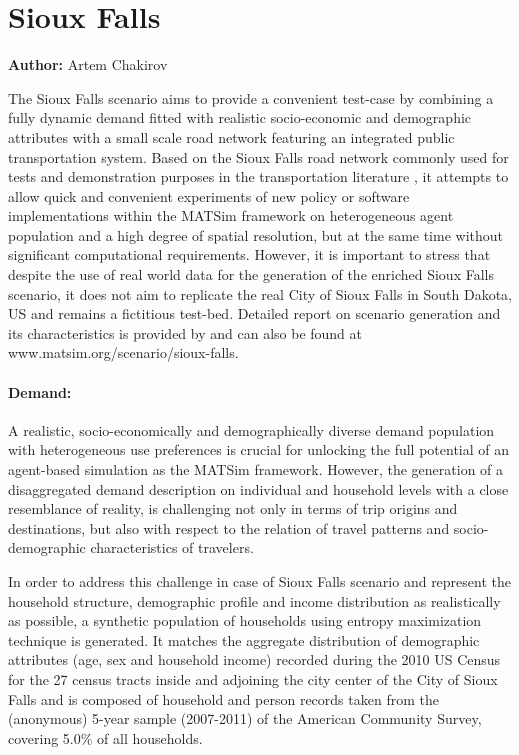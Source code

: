 \section{Sioux Falls}
\label{ch:scenarios:siouxfalls}
\hfill \textbf{Author:} Artem Chakirov

The Sioux Falls scenario aims to provide a convenient test-case by combining a fully dynamic demand fitted with realistic socio-economic and demographic attributes with a small scale road network featuring an integrated public transportation system. Based on the Sioux Falls road network commonly used for tests and demonstration purposes in the transportation literature \citep[][]{BarGera_TNTP_Webpage_2013}, it attempts to allow quick and convenient experiments of new policy or software implementations within the MATSim framework on heterogeneous agent population and a high degree of spatial resolution, but at the same time without significant computational requirements. However, it is important to stress that despite the use of real world data for the generation of the enriched Sioux Falls scenario, it does not aim to replicate the real City of Sioux Falls in South Dakota, US and remains a fictitious test-bed. Detailed report on scenario generation and its characteristics is provided by \citet[][]{ChakirovFourie_TechRep_FCL_2014} and can also be found at www.matsim.org/scenario/sioux-falls. 

\paragraph{Demand:}

A realistic, socio-economically and demographically diverse demand population with  heterogeneous use preferences is crucial for unlocking the full potential of an agent-based simulation as the MATSim framework. However, the generation of a disaggregated demand description on individual and household levels with a close resemblance of reality, is challenging not only in terms of trip origins and destinations, but also with respect to the relation of travel patterns and socio-demographic characteristics of travelers.

In order to address this challenge in case of Sioux Falls scenario and represent the household structure, demographic profile and income distribution as realistically as possible, a synthetic population of households using entropy maximization technique is generated. It matches the aggregate distribution of demographic attributes (age, sex and household income) recorded during the 2010 US Census for the 27 census tracts inside and adjoining the city center of the City of Sioux Falls and is composed of household and person records taken from the (anonymous) 5-year sample (2007-2011) of the American Community Survey, covering 5.0\% of all households.

